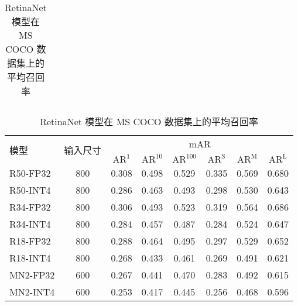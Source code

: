 \begin{table}[p]
\begin{subtable}[t]{\columnwidth}
\begin{tabular}{lc*{6}{c}}
      \bottomrule
    \end{tabular}
  \end{subtable}
  \newline
  \vspace*{0.5 cm}
  \newline
  \begin{subtable}[t]{\columnwidth}
    \centering
    \caption{RetinaNet 模型在 MS COCO 数据集上的平均召回率}
    \label{tab::fqn::retina_coco_mAR}
    \begin{tabular}{lc*{6}{c}}
      \toprule
      \multirow{2}{*}{模型} & \multirow{2}{*}{输入尺寸} & \multicolumn{6}{c}{mAR} \\
      & & $\mathrm{AR}^{1}$ & $\mathrm{AR}^{10}$ & $\mathrm{AR}^{100}$ &
      $\mathrm{AR} ^ {\mathrm{S}}$ & $\mathrm{AR} ^ {\mathrm{M}}$ & $\mathrm{AR} ^ {\mathrm{L}}$ \\
      \midrule
      R50-FP32 & 800 &0.308 &0.498 &0.529 &0.335 &0.569 &0.680 \\
      R50-INT4 & 800 &0.286 &0.463 &0.493 &0.298 &0.530 &0.643 \\
      \hdashline
      R34-FP32 & 800 &0.306 &0.493 &0.523 &0.319 &0.564 &0.686 \\
      R34-INT4 & 800 &0.284 &0.457 &0.487 &0.284 &0.524 &0.647 \\
      \hdashline
      R18-FP32 & 800 &0.288 &0.464 &0.495 &0.297 &0.529 &0.652 \\
      R18-INT4 & 800 &0.268 &0.433 &0.461 &0.269 &0.491 &0.621 \\
      \hdashline
      MN2-FP32 & 600 &0.267 &0.441 &0.470 &0.283 &0.492 &0.615 \\
      MN2-INT4 & 600 &0.253 &0.417 &0.445 &0.256 &0.468 &0.596 \\
      \bottomrule
    \end{tabular}
  \end{subtable}
\end{table}

